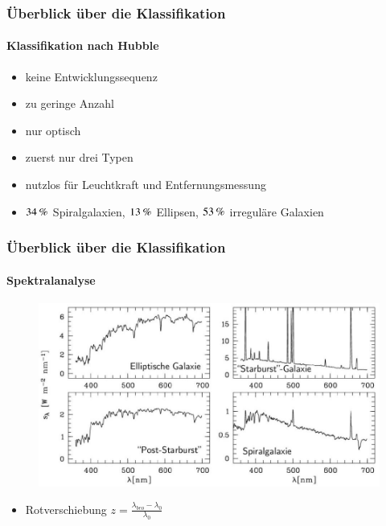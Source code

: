 \begin{frame}
\frametitle{Überblick über die Klassifikation}
\framesubtitle{Klassifikation nach Hubble}

\begin{itemize}
\item keine Entwicklungssequenz
\item zu geringe Anzahl
\item nur optisch
\item zuerst nur drei Typen
\item nutzlos für Leuchtkraft und Entfernungsmessung
\item $\unit[34]{\%}$ Spiralgalaxien, $\unit[13]{\%}$ Ellipsen, $\unit[53]{\%}$ irreguläre Galaxien
\end{itemize}

\end{frame}

\begin{frame}
\frametitle{Überblick über die Klassifikation}
\framesubtitle{Spektralanalyse}

\begin{figure}
\includegraphics[scale=0.4]{Galaxiespektren.jpg}
\end{figure}

\begin{itemize}
\item Rotverschiebung $z = \frac{\lambda_{beo} - \lambda_0}{\lambda_0}$
\end{itemize}

\end{frame}


